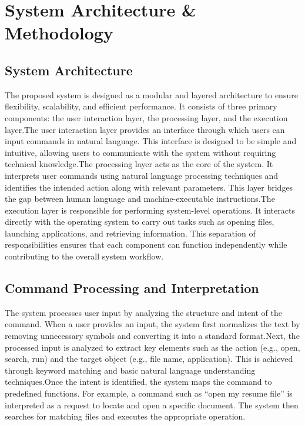 \documentclass[conference]{IEEEtran}
\begin{document}
\section{\large System Architecture \& Methodology}

\subsection{System Architecture}
\noindent
The proposed system is designed as a modular and layered architecture to ensure flexibility, scalability, and efficient performance. It consists of three primary components: the user interaction layer, the processing layer, and the execution layer.The user interaction layer provides an interface through which users can input commands in natural language. This interface is designed to be simple and intuitive, allowing users to communicate with the system without requiring technical knowledge.The processing layer acts as the core of the system. It interprets user commands using natural language processing techniques and identifies the intended action along with relevant parameters. This layer bridges the gap between human language and machine-executable instructions.The execution layer is responsible for performing system-level operations. It interacts directly with the operating system to carry out tasks such as opening files, launching applications, and retrieving information. This separation of responsibilities ensures that each component can function independently while contributing to the overall system workflow.

\subsection{Command Processing and Interpretation}
\noindent
The system processes user input by analyzing the structure and intent of the command. When a user provides an input, the system first normalizes the text by removing unnecessary symbols and converting it into a standard format.Next, the processed input is analyzed to extract key elements such as the action (e.g., open, search, run) and the target object (e.g., file name, application). This is achieved through keyword matching and basic natural language understanding techniques.Once the intent is identified, the system maps the command to predefined functions. For example, a command such as “open my resume file” is interpreted as a request to locate and open a specific document. The system then searches for matching files and executes the appropriate operation.
\end{document}
